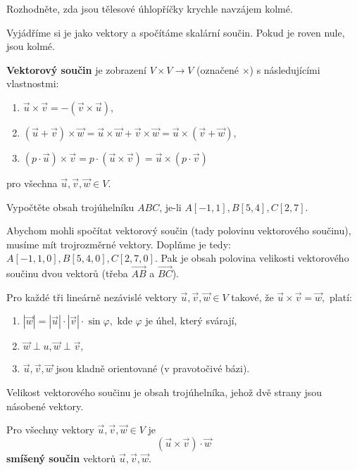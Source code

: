 \begin{priklad}
Rozhodněte, zda jsou tělesové úhlopříčky krychle navzájem kolmé.
\end{priklad}

\begin{reseni}
Vyjádříme si je jako vektory a spočítáme skalární součin. Pokud je roven nule, jsou kolmé.
\end{reseni}

\begin{definition}
\textbf{Vektorový součin} je zobrazení $V\times V\to  V$ (označené $\times$) s následujícími vlastnostmi:
\begin{enumerate}[$i.$]
\item $\vec u\times \vec v = -(\vec v \times \vec u),$
\item $(\vec u + \vec v)\times \vec w = \vec u \times \vec w + \vec v \times \vec w = \vec u\times (\vec v + \vec w),$
\item $(p\cdot \vec u)\times \vec v = p\cdot(\vec u \times \vec v) = \vec u \times (p\cdot \vec v)$
\end{enumerate}
pro všechna $\vec u, \vec v, \vec w \in V.$
\end{definition}

\begin{priklad}
Vypočtěte obsah trojúhelníku $ABC$, je-li $A[-1,1], B[5,4], C[2,7].$
\end{priklad}

\begin{reseni}
Abychom mohli spočítat vektorový součin (tady polovinu vektorového součinu), musíme
mít trojrozměrné vektory. Doplňme je tedy: $A[-1,1, 0], B[5,4, 0], C[2,7,0].$ Pak
je obsah polovina velikosti vektorového součinu dvou vektorů (třeba $\overrightarrow{AB}$ a $\overrightarrow{BC}$).
\end{reseni}

\begin{veta}
    Pro každé tři lineárně nezávislé vektory $\vec u, \vec v, \vec w \in V$ takové,
   že $\vec u\times \vec v = \vec w,$ platí:
   \begin{enumerate}[$i.$]
   \item $|\vec w| = |\vec u|\cdot |\vec v|\cdot \sin \varphi,$ kde $\varphi$ je úhel, který svárají,
  	\item $\vec w\perp u, \vec w \perp \vec v,$
  	\item $\vec u, \vec v, \vec w$ jsou kladně orientované (v pravotočivé bázi).
   \end{enumerate}
\end{veta}

\begin{pozn}
    Velikost vektorového součinu je obsah trojúhelníka, jehož dvě strany jsou
    násobené vektory.
\end{pozn}

\begin{definition}
    Pro všechny vektory $\vec u, \vec v, \vec w \in V$ je
    $$(\vec u \times \vec v) \cdot \vec w$$
    \textbf{smíšený součin} vektorů $\vec u, \vec v, \vec w.$
\end{definition}
